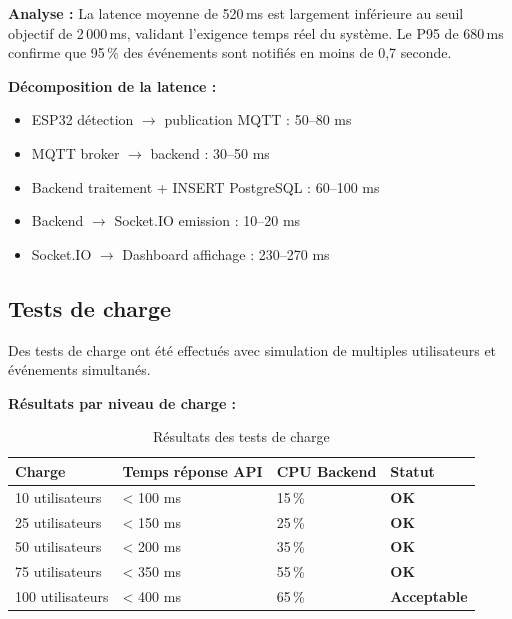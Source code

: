 \textbf{Analyse :} La latence moyenne de 520\,ms est largement inférieure au seuil objectif de 2\,000\,ms, validant l'exigence temps réel du système. Le P95 de 680\,ms confirme que 95\,\% des événements sont notifiés en moins de 0,7 seconde.

\textbf{Décomposition de la latence :}
\begin{itemize}
    \item ESP32 détection $\rightarrow$ publication MQTT : 50--80 ms
    \item MQTT broker $\rightarrow$ backend : 30--50 ms
    \item Backend traitement + INSERT PostgreSQL : 60--100 ms
    \item Backend $\rightarrow$ Socket.IO emission : 10--20 ms
    \item Socket.IO $\rightarrow$ Dashboard affichage : 230--270 ms
\end{itemize}

\subsection{Tests de charge}

Des tests de charge ont été effectués avec simulation de multiples utilisateurs et événements simultanés.

\textbf{Résultats par niveau de charge :}

\begin{table}[htbp]
\centering
\caption{Résultats des tests de charge}
\label{tab:tests_charge}
\small
\begin{tabular}{@{}p{3cm}p{3cm}p{3cm}p{3cm}@{}}
\toprule
\textbf{Charge} & \textbf{Temps réponse API} & \textbf{CPU Backend} & \textbf{Statut} \\
\midrule
\rowcolor{gray!10}
10 utilisateurs & < 100 ms & 15\,\% & \textcolor{green!60!black}{\textbf{OK}} \\
25 utilisateurs & < 150 ms & 25\,\% & \textcolor{green!60!black}{\textbf{OK}} \\
\rowcolor{gray!10}
50 utilisateurs & < 200 ms & 35\,\% & \textcolor{green!60!black}{\textbf{OK}} \\
75 utilisateurs & < 350 ms & 55\,\% & \textcolor{green!60!black}{\textbf{OK}} \\
\rowcolor{gray!10}
100 utilisateurs & < 400 ms & 65\,\% & \textcolor{orange!80!black}{\textbf{Acceptable}} \\
\bottomrule
\end{tabular}
\end{table}

